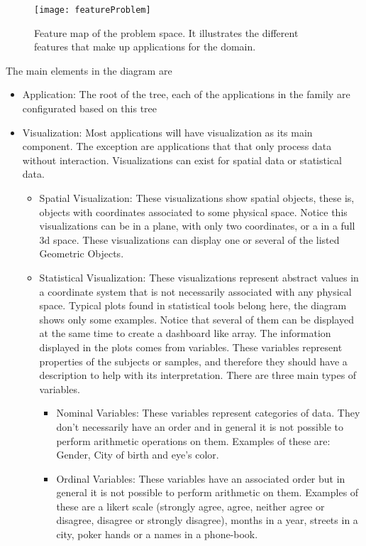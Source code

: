 \begin{figure}
\centering
\texttt{[image: featureProblem]}
\caption{\label{fig_feature_problem}Feature map of the problem space. It illustrates the different features that make up applications for the domain.}
\end{figure}

The main elements in the diagram are

\begin{itemize}
\item Application: The root of the tree, each of the applications in the family are configurated based on this tree
\item Visualization: Most applications will have visualization as its main component. The exception are applications that that only process data without interaction. Visualizations can exist for spatial data or statistical data.
\begin{itemize}
\item Spatial Visualization: These visualizations show spatial objects, these is, objects with coordinates associated to some physical space. Notice this visualizations can be in a plane, with only two coordinates, or a in a full 3d space. These visualizations can display one or several of the listed Geometric Objects.
\item Statistical Visualization: These visualizations represent abstract values in a coordinate system that is not necessarily associated with any physical space. Typical plots found in statistical tools belong here, the diagram shows only some examples. Notice that several of them can be displayed at the same time to create a dashboard like array. The information displayed in the plots comes from variables. These variables represent properties of the subjects or samples, and therefore they should have a description to help with its interpretation. There are three main types of variables.
\begin{itemize}
\item Nominal Variables: These variables represent categories of data. They don't necessarily have an order and in general it is not possible to perform arithmetic operations on them. Examples of these are: Gender, City of birth and eye's color.
\item Ordinal Variables: These variables have an associated order but in general it is not possible to perform arithmetic on them. Examples of these are a likert scale (strongly agree, agree, neither agree or disagree, disagree or strongly disagree), months in a year, streets in a city, poker hands or a names in a phone-book.

\end{itemize}
\end{itemize}
\end{itemize}

